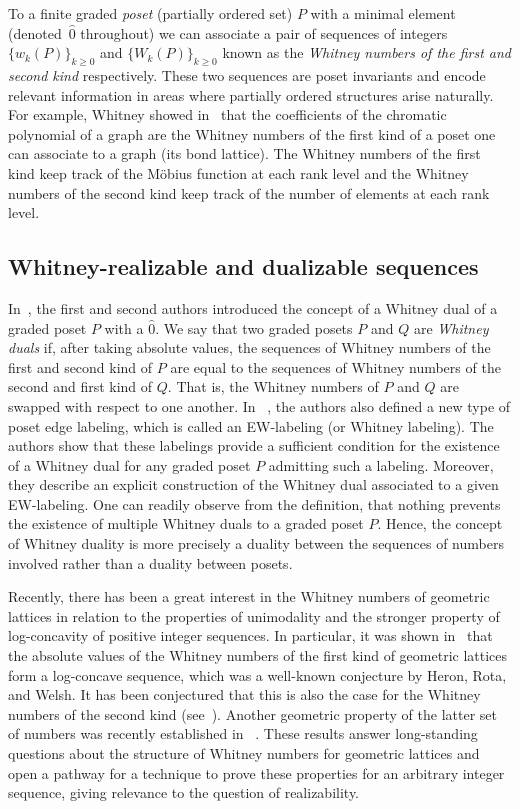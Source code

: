\documentclass[11pt]{article}
\theoremstyle{definition}
\numberwithin{equation}{section}
\begin{document}
To a finite graded \emph{poset}  (partially ordered set) $P$ with a minimal element (denoted~$\hat{0}$ throughout) we can associate a pair of sequences of integers $\{w_k(P)\}_{k\ge 0}$ and $\{W_k(P)\}_{k\ge 0}$ known as the \emph{Whitney numbers of the first and second kind} respectively. These two sequences  are poset 
 invariants and encode relevant information in areas where partially ordered structures arise naturally. For example, Whitney showed in~\cite{Whitney1932} that the coefficients of the  chromatic polynomial of a graph are the Whitney numbers of the first kind of a poset one can associate to a graph (its bond lattice). The Whitney numbers of the first kind  keep track of the M\"obius function at each rank level and the Whitney numbers of the second kind keep track of the number of elements at each rank level. 

 
 \subsection{Whitney-realizable and dualizable sequences}
 In~\cite{GonzalezHallam2021}, the first and second authors introduced the concept of a Whitney dual of a graded poset $P$ with a $\hat{0}$.
 We say that two graded posets $P$ and $Q$ are \emph{Whitney duals} if, after taking absolute values, the sequences of Whitney numbers of the first and second kind of $P$ are equal to the sequences of Whitney numbers of the second and first kind of $Q$. That is, the Whitney numbers of $P$ and $Q$ are swapped with respect to one another. In ~\cite{GonzalezHallam2021}, the authors also defined a new type of poset edge labeling, which is called an EW-labeling (or Whitney labeling). The authors show that these labelings provide a sufficient condition for the existence of a Whitney dual for any graded poset $P$ admitting such a labeling.  Moreover, they describe an explicit construction of the Whitney dual associated to a given EW-labeling.  One can readily observe from the definition, that nothing prevents the existence of multiple Whitney duals to a graded poset $P$. Hence, the concept of Whitney duality is more precisely a duality between the sequences of numbers involved rather than a duality between posets. 

Recently, there has been a great interest in the Whitney numbers of geometric lattices in relation to the properties of unimodality and the stronger property of log-concavity of positive integer sequences. In particular, it was shown in~\cite{AdiprasitoHuhKatz2018} that the absolute values of the Whitney numbers of the first kind of geometric lattices form a log-concave sequence, which was a well-known  conjecture by Heron, Rota, and Welsh. It has been conjectured that this is also the case for the Whitney numbers of the second kind (see~\cite[page 289]{Welsh1976}). Another geometric property of the latter set of numbers was recently established in ~\cite{BradenHuhMatherneProudfootWang2022}. These results answer long-standing questions about the structure of Whitney numbers for geometric lattices and open a pathway for a technique to prove these properties for an arbitrary integer sequence, giving relevance to the question of realizability. 
\end{document}

